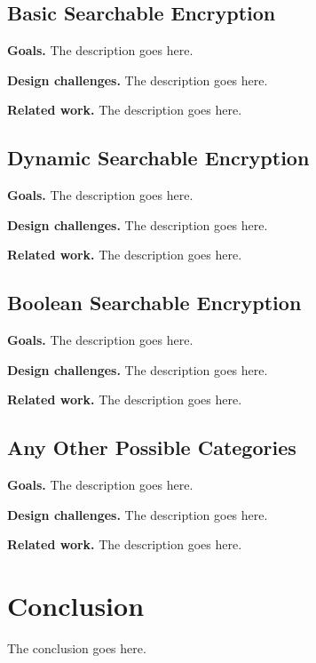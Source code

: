 \documentclass[conference]{IEEEtran}
\begin{document}

\subsection{Basic Searchable Encryption}

\textbf{Goals.} The description goes here.


\textbf{Design challenges.} The description goes here.

\textbf{Related work.} The description goes here.

\subsection{Dynamic Searchable Encryption}

\textbf{Goals.} The description goes here.


\textbf{Design challenges.} The description goes here.

\textbf{Related work.} The description goes here.




\subsection{Boolean Searchable Encryption}

\textbf{Goals.} The description goes here.


\textbf{Design challenges.} The description goes here.

\textbf{Related work.} The description goes here.

\subsection{Any Other Possible Categories}

\textbf{Goals.} The description goes here.


\textbf{Design challenges.} The description goes here.

\textbf{Related work.} The description goes here.

\section{Conclusion}

The conclusion goes here.




\end{document}
